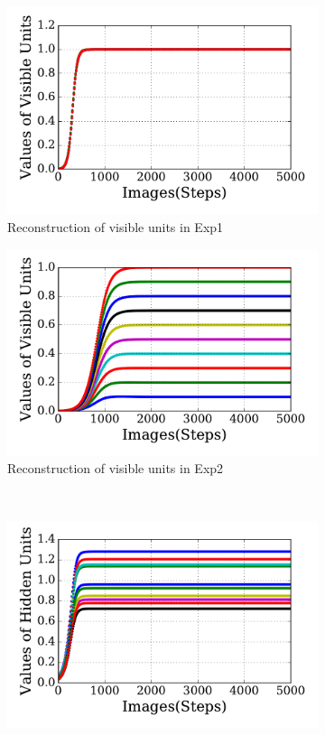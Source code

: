 \begin{figure}
\begin{subfigure}[t]{0.48\textwidth}
	\end{subfigure}
	\begin{subfigure}[t]{0.48\textwidth}
		\includegraphics[width=\textwidth]{pics_sdlm/20_exp_AE/exp1_recon_non.pdf}
		\caption{Reconstruction of visible units in Exp1}
	\end{subfigure}
	\begin{subfigure}[t]{0.48\textwidth}
		\includegraphics[width=\textwidth]{pics_sdlm/20_exp_AE/exp2_recon_non.pdf}
		\caption{Reconstruction of visible units in Exp2}
	\end{subfigure}\\
	\begin{subfigure}[t]{0.48\textwidth}
		\includegraphics[width=\textwidth]{pics_sdlm/20_exp_AE/exp1_hid_non.pdf}

\end{subfigure}
\end{figure}
